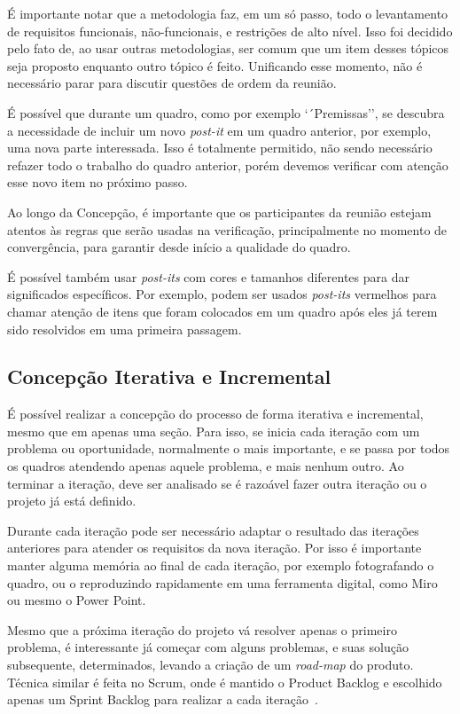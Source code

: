 \documentclass[fontsize=12pt, a4paper,pagesize=auto,toc=listof, ,twoside,chapterprefix=false,appendixprefix=true,open=right]{scrbook}
\begin{document}
É importante notar que a metodologia faz, em um só passo, todo o levantamento de requisitos funcionais, não-funcionais, e restrições de alto nível. Isso foi decidido pelo fato de, ao usar outras metodologias, ser comum que um item desses tópicos seja proposto enquanto outro tópico é feito. Unificando esse momento, não é necessário parar para discutir questões de ordem da reunião.

É possível que durante um quadro, como por exemplo `´Premissas'', se descubra a necessidade de incluir um novo \textit{post-it} em um quadro anterior, por exemplo, uma nova parte interessada. Isso é totalmente permitido, não sendo necessário refazer todo o trabalho do quadro anterior, porém devemos verificar com atenção esse novo item no próximo passo.

Ao longo da Concepção, é importante que os participantes da reunião estejam atentos às regras que serão usadas na verificação, principalmente no momento de convergência, para garantir desde início a qualidade do quadro.

É possível também usar \textit{post-its} com cores e tamanhos diferentes para dar significados específicos. Por exemplo, podem ser usados \textit{post-its} vermelhos para chamar atenção de itens que foram colocados em um quadro após eles já terem sido resolvidos em uma primeira passagem.

\subsection{Concepção Iterativa e Incremental}

É possível realizar a concepção do processo de forma iterativa e incremental, mesmo que em apenas uma seção. Para isso, se inicia cada iteração com um problema ou oportunidade, normalmente o mais importante, e se passa por todos os quadros atendendo apenas aquele problema, e mais nenhum outro. Ao terminar a iteração, deve ser analisado se é razoável fazer outra iteração ou o projeto já está definido.

Durante cada iteração pode ser necessário adaptar o resultado das iterações anteriores para atender os requisitos da nova iteração. Por isso é importante manter alguma memória ao final de cada iteração, por exemplo fotografando o quadro, ou o reproduzindo rapidamente em uma ferramenta digital, como Miro ou mesmo o Power Point.

Mesmo que a próxima iteração do projeto vá resolver apenas o primeiro problema, é interessante já começar com alguns problemas, e suas solução subsequente, determinados, levando a criação de um \textit{road-map} do produto. Técnica similar é feita no Scrum, onde é mantido o Product Backlog e escolhido apenas um Sprint Backlog para realizar a cada iteração~\citep{scrum:sbok:guide}.
\end{document}
